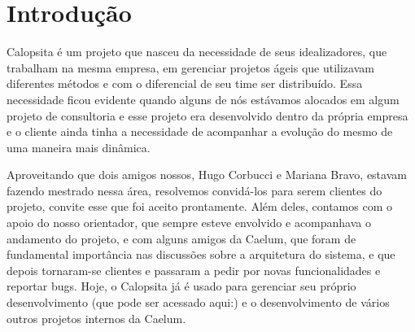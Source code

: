 \section{Introdução}
Calopsita é um projeto que nasceu da necessidade de seus idealizadores, que trabalham na mesma empresa, em gerenciar projetos ágeis que utilizavam diferentes métodos e com o diferencial de seu time ser distribuído. Essa necessidade ficou evidente quando alguns de nós estávamos alocados em algum projeto de consultoria e esse projeto era desenvolvido dentro da própria empresa e o cliente ainda tinha a necessidade de acompanhar a evolução do mesmo de uma maneira mais dinâmica.

Aproveitando que dois amigos nossos, Hugo Corbucci e Mariana Bravo, estavam fazendo mestrado nessa área, resolvemos convidá-los para serem clientes do projeto, convite esse que foi aceito prontamente. Além deles, contamos com o apoio do nosso orientador, que sempre esteve envolvido e acompanhava o andamento do projeto, e com alguns amigos da Caelum, que foram de fundamental importância nas discussões sobre a arquitetura do sistema, e que depois tornaram-se clientes e passaram a pedir por novas funcionalidades e reportar bugs. Hoje, o Calopsita já é usado para gerenciar seu próprio desenvolvimento (que pode ser acessado aqui:) e o desenvolvimento de vários outros projetos internos da Caelum.


